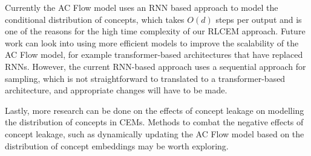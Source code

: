 Currently the 
AC Flow model uses an RNN based approach
to model the conditional distribution of concepts,
which takes $O(d)$ steps per output and is one of the reasons
for the high time complexity of our RLCEM approach.
 Future work can
look into using more efficient models to improve
the scalability of the AC Flow model, for example transformer-based
architectures that have replaced RNNs. However, the current
RNN-based approach uses a sequential approach
for sampling, which is not straightforward to translated
to a transformer-based architecture, and appropriate changes 
will have to be made.

Lastly, more research can be done on the effects
of concept leakage on modelling the distribution
of concepts in CEMs. Methods to combat the negative
effects of concept leakage, such as dynamically updating
the AC Flow model based on the distribution of concept 
embeddings may be worth exploring.

